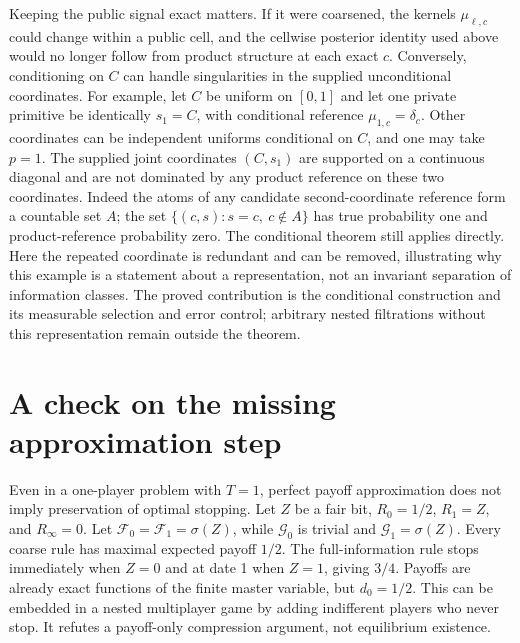 \documentclass[11pt]{article}
\theoremstyle{remark}\newtheorem{remark}[theorem]{Remark}
\begin{document}
Keeping the public signal exact matters. If it were coarsened, the
kernels $\mu_{\ell,c}$ could change within a public cell, and the
cellwise posterior identity used above would no longer follow from
product structure at each exact $c$. Conversely, conditioning on $C$
can handle singularities in the supplied unconditional coordinates.
For example, let $C$ be uniform on $[0,1]$ and let one private primitive
be identically $s_1=C$, with conditional reference $\mu_{1,c}=\delta_c$.
Other coordinates can be independent uniforms conditional on $C$,
and one may take $p=1$. The supplied joint coordinates $(C,s_1)$
are supported on a continuous diagonal and are not dominated by any
product reference on these two coordinates. Indeed the atoms of any
candidate second-coordinate reference form a countable set $A$;
the set $\{(c,s):s=c,\ c\notin A\}$ has true probability one
and product-reference probability zero. The conditional theorem still
applies directly. Here the repeated coordinate is redundant and can
be removed, illustrating why this example is a statement about a
representation, not an invariant separation of information classes.
The proved contribution is the conditional construction and its
measurable selection and error control; arbitrary nested filtrations
without this representation remain outside the theorem.

\section*{A check on the missing approximation step}
Even in a one-player problem with $T=1$, perfect payoff approximation does not imply preservation of optimal stopping. Let $Z$ be a fair bit, $R_0=1/2$, $R_1=Z$, and $R_\infty=0$. Let $\mathcal F_0=\mathcal F_1=\sigma(Z)$, while $\mathcal G_0$ is trivial and $\mathcal G_1=\sigma(Z)$. Every coarse rule has maximal expected payoff $1/2$. The full-information rule stops immediately when $Z=0$ and at date 1 when $Z=1$, giving $3/4$. Payoffs are already exact functions of the finite master variable, but $d_0=1/2$. This can be embedded in a nested multiplayer game by adding indifferent players who never stop. It refutes a payoff-only compression argument, not equilibrium existence.
\end{document}
